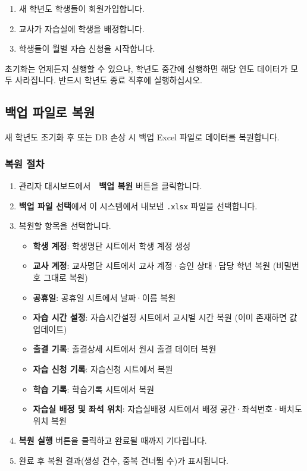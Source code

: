 \documentclass[a4paper,12pt]{article}
\newcommand{\menu}[1]{\textcolor{primary}{\textbf{#1}}}
\begin{document}
\begin{enumerate}[leftmargin=1.5em]
    \item 새 학년도 학생들이 회원가입합니다.
    \item 교사가 자습실에 학생을 배정합니다.
    \item 학생들이 월별 자습 신청을 시작합니다.
\end{enumerate}

\begin{notebox}
  초기화는 언제든지 실행할 수 있으나, 학년도 중간에 실행하면
  해당 연도 데이터가 모두 사라집니다. 반드시 학년도 종료 직후에 실행하십시오.
\end{notebox}

\subsection{백업 파일로 복원}

새 학년도 초기화 후 또는 DB 손상 시 백업 Excel 파일로 데이터를 복원합니다.

\subsubsection{복원 절차}

\begin{enumerate}[leftmargin=1.5em]
    \item 관리자 대시보드에서 \menu{📂 백업 복원} 버튼을 클릭합니다.
    \item \menu{백업 파일 선택}에서 이 시스템에서 내보낸 \texttt{.xlsx} 파일을 선택합니다.
    \item 복원할 항목을 선택합니다.
    \begin{itemize}
        \item \textbf{학생 계정}: 학생명단 시트에서 학생 계정 생성
        \item \textbf{교사 계정}: 교사명단 시트에서 교사 계정·승인 상태·담당 학년 복원 (비밀번호 그대로 복원)
        \item \textbf{공휴일}: 공휴일 시트에서 날짜·이름 복원
        \item \textbf{자습 시간 설정}: 자습시간설정 시트에서 교시별 시간 복원 (이미 존재하면 값 업데이트)
        \item \textbf{출결 기록}: 출결상세 시트에서 원시 출결 데이터 복원
        \item \textbf{자습 신청 기록}: 자습신청 시트에서 복원
        \item \textbf{학습 기록}: 학습기록 시트에서 복원
        \item \textbf{자습실 배정 및 좌석 위치}: 자습실배정 시트에서 배정 공간·좌석번호·배치도 위치 복원
    \end{itemize}
    \item \menu{복원 실행} 버튼을 클릭하고 완료될 때까지 기다립니다.
    \item 완료 후 복원 결과(생성 건수, 중복 건너뜀 수)가 표시됩니다.
\end{enumerate}
\end{document}
